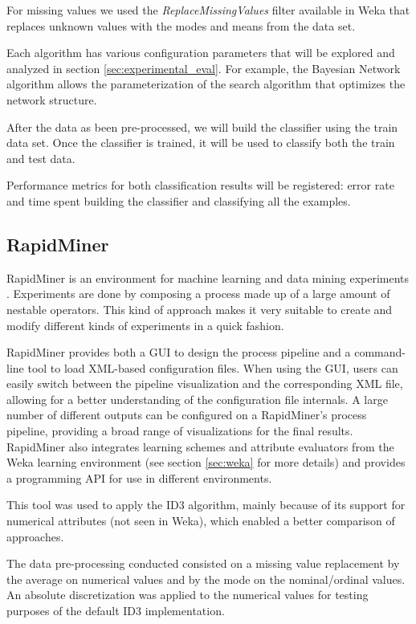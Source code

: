 \documentclass[a4paper]{llncs}
\begin{document}
For missing values we used the \textit{ReplaceMissingValues} filter available in Weka that
replaces unknown values with the modes and means from the data set. 

Each algorithm has various configuration parameters that will be explored
and analyzed in section \ref{sec:experimental_eval}.
For example, the Bayesian Network
algorithm allows the parameterization of the search algorithm that optimizes the network structure.

After the data as been pre-processed,
we will build the classifier using the train data set.
Once the classifier is trained, it will be used to classify both the train and test data.

Performance metrics for both classification results will be registered: error rate and time spent
building the classifier and classifying all the examples.

\subsection{RapidMiner}

RapidMiner is an environment for machine learning and data mining experiments 
\cite{4}. Experiments are done by composing a process made up of a large amount
of nestable operators. This kind of approach makes it very suitable to create
and modify different kinds of experiments in a quick fashion.

RapidMiner provides both a GUI to design the process pipeline and a command-line
tool to load XML-based configuration files. When using the GUI, users can easily
switch between the pipeline visualization and the corresponding XML file,
allowing for a better understanding of the configuration file internals. A large
number of different outputs can be configured on a RapidMiner's process 
pipeline, providing a broad range of visualizations for the final results.
RapidMiner also integrates learning schemes and attribute evaluators from the 
Weka \cite{weka} learning environment (see section \ref{sec:weka} for more 
details) and provides a programming API for use in different environments.

This tool was used to apply the ID3 \cite{id3}\cite{1} algorithm, mainly because
of its support for numerical attributes (not seen in Weka), which enabled a
better comparison of approaches.

The data pre-processing conducted consisted on a missing value replacement by 
the average on numerical values and by the mode on the nominal/ordinal values. 
An absolute discretization was applied to the numerical values for testing
purposes of the default ID3 implementation.
\end{document}
